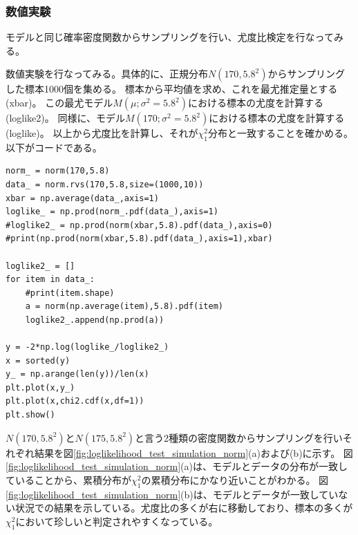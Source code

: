 \subsubsection{数値実験}
モデルと同じ確率密度関数からサンプリングを行い、尤度比検定を行なってみる。

数値実験を行なってみる。具体的に、正規分布$N(170,5.8^2)$からサンプリングした標本1000個を集める。
標本から平均値を求め、これを最尤推定量とする(xbar)。
この最尤モデル$M(\mu;\sigma^2=5.8^2) $における標本の尤度を計算する(loglike2)。
同様に、モデル$M(170;\sigma^2=5.8^2)$における標本の尤度を計算する(loglike)。
以上から尤度比を計算し、それが$\chi^2_1$分布と一致することを確かめる。
以下がコードである。

\begin{lstlisting}
norm_ = norm(170,5.8)
data_ = norm.rvs(170,5.8,size=(1000,10))
xbar = np.average(data_,axis=1)
loglike_ = np.prod(norm_.pdf(data_),axis=1)
#loglike2_ = np.prod(norm(xbar,5.8).pdf(data_),axis=0)
#print(np.prod(norm(xbar,5.8).pdf(data_),axis=1),xbar)

loglike2_ = []
for item in data_:
    #print(item.shape)
    a = norm(np.average(item),5.8).pdf(item)
    loglike2_.append(np.prod(a))

y = -2*np.log(loglike_/loglike2_)
x = sorted(y)
y_ = np.arange(len(y))/len(x)
plt.plot(x,y_)
plt.plot(x,chi2.cdf(x,df=1))
plt.show()

\end{lstlisting}

$N(170,5.8^2)$と$N(175,5.8^2)$と言う2種類の密度関数からサンプリングを行いそれぞれ結果を図\ref{fig:loglikelihood_test_simulation_norm}(a)および(b)に示す。
図\ref{fig:loglikelihood_test_simulation_norm}(a)は、モデルとデータの分布が一致していることから、累積分布が$\chi^2_1$の累積分布にかなり近いことがわかる。
図\ref{fig:loglikelihood_test_simulation_norm}(b)は、モデルとデータが一致していない状況での結果を示している。尤度比の多くが右に移動しており、標本の多くが$\chi^2_1$において珍しいと判定されやすくなっている。


